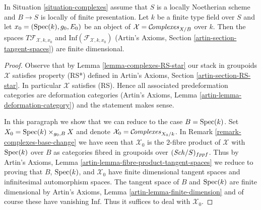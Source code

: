 \begin{lemma}
\label{lemma-complexes-tangent-space}
In Situation \ref{situation-complexes} assume that $S$ is a locally Noetherian
scheme and $B \to S$ is locally of finite presentation.
Let $k$ be a finite type field over $S$ and let
$x_0 = (\mathop{\mathrm{Spec}}(k), g_0, E_0)$
be an object of $\mathcal{X} = \mathcal{C}\!\mathit{omplexes}_{X/B}$ over $k$.
Then the spaces $T\mathcal{F}_{\mathcal{X}, k, x_0}$ and
$\text{Inf}(\mathcal{F}_{\mathcal{X}, k, x_0})$
(Artin's Axioms, Section \ref{artin-section-tangent-spaces})
are finite dimensional.
\end{lemma}

\begin{proof}
Observe that by Lemma \ref{lemma-complexes-RS-star}
our stack in groupoids $\mathcal{X}$ satisfies property (RS*)
defined in Artin's Axioms, Section \ref{artin-section-RS-star}.
In particular $\mathcal{X}$ satisfies (RS).
Hence all associated predeformation
categories are deformation categories
(Artin's Axioms, Lemma \ref{artin-lemma-deformation-category})
and the statement makes sense.

\medskip\noindent
In this paragraph we show that we can reduce to the case $B = \mathop{\mathrm{Spec}}(k)$.
Set $X_0 = \mathop{\mathrm{Spec}}(k) \times_{g_0, B} X$
and denote $\mathcal{X}_0 = \mathcal{C}\!\mathit{omplexes}_{X_0/k}$. In
Remark \ref{remark-complexes-base-change} we have seen that
$\mathcal{X}_0$ is the $2$-fibre product of $\mathcal{X}$ with
$\mathop{\mathrm{Spec}}(k)$ over $B$ as categories fibred in groupoids over
$(\mathit{Sch}/S)_{fppf}$. Thus by
Artin's Axioms, Lemma \ref{artin-lemma-fibre-product-tangent-spaces}
we reduce to proving that $B$, $\mathop{\mathrm{Spec}}(k)$, and $\mathcal{X}_0$
have finite dimensional tangent spaces and infinitesimal automorphism
spaces. The tangent space of $B$ and $\mathop{\mathrm{Spec}}(k)$ are finite dimensional by
Artin's Axioms, Lemma \ref{artin-lemma-finite-dimension}
and of course these have vanishing $\text{Inf}$.
Thus it suffices to deal with $\mathcal{X}_0$.


\end{proof}
